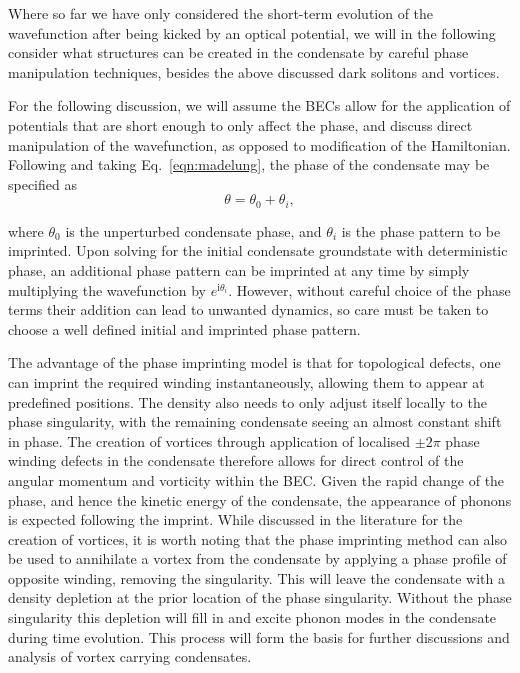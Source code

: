 Where so far we have only considered the short-term evolution of the wavefunction after being kicked by an optical potential, we will in the following consider what structures can be created in the condensate by careful phase manipulation techniques, besides the above discussed dark solitons and vortices.

For the following discussion, we will assume the BECs allow for the application of potentials that are short enough to only affect the phase, and discuss direct manipulation of the wavefunction, as opposed to modification of the Hamiltonian. Following \cite{BK:Pitaevskii_Stringari_2003} and taking Eq.~\eqref{eqn:madelung}, the phase of the condensate may be specified as
\begin{equation}
\theta = \theta_0 + \theta_i,
\end{equation}

where $\theta_0$ is the unperturbed condensate phase, and $\theta_i$ is the phase pattern to be imprinted. Upon solving for the initial condensate groundstate with deterministic phase, an additional phase pattern can be imprinted at any time by simply multiplying the wavefunction by $e^{\text{i}\theta_i}$. However, without careful choice of the phase terms their addition can lead to unwanted dynamics, so care must be taken to choose a well defined initial and imprinted phase pattern.

The advantage of the phase imprinting model is that for topological defects, one can imprint the required winding instantaneously, allowing them to appear at predefined positions. The density also needs to only adjust itself locally to the phase singularity, with the remaining condensate seeing an almost constant shift in phase. The creation of vortices through application of localised $\pm 2\pi$ phase winding defects in the condensate therefore allows for direct control of the angular momentum and vorticity within the BEC. Given the rapid change of the phase, and hence the kinetic energy of the condensate, the appearance of phonons is expected following the imprint. While discussed in the literature for the creation of vortices, it is worth noting that the phase imprinting method can also be used to annihilate a vortex from the condensate by applying a phase profile of opposite winding, removing the singularity. This will leave the condensate with a density depletion at the prior location of the phase singularity. Without the phase singularity this depletion will fill in and excite phonon modes in the condensate during time evolution. This process will form the basis for further discussions and analysis of vortex carrying condensates.

